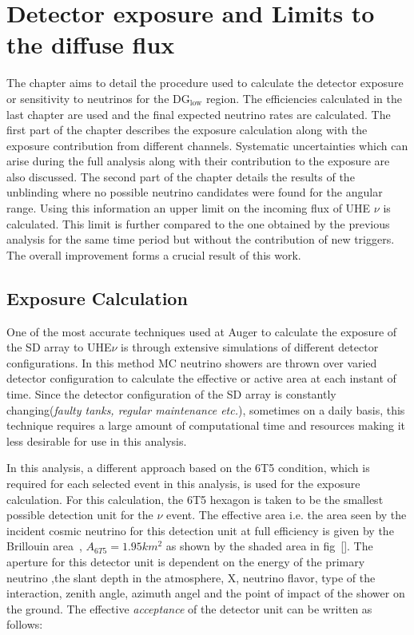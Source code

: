 
\chapter{Detector exposure and Limits to the diffuse flux}
\label{sec:align}
 
The chapter aims to detail the procedure used to calculate the detector exposure or sensitivity to neutrinos for the DG$\mathrm{_{low}}$ region. The efficiencies calculated in the last chapter are used and the final expected neutrino rates are calculated. The first part of the chapter describes the exposure calculation along with the exposure contribution from different channels. Systematic uncertainties which can arise during the full analysis along with their contribution to the exposure are also discussed. 
The second part of the chapter details the results of the unblinding where no possible neutrino candidates were found for the angular range. Using this information an upper limit on the incoming flux of UHE $\nu$ is calculated. This limit is further compared to the one obtained by the previous analysis for the same time period but without the contribution of new triggers. The overall improvement forms a crucial result of this work. 


\section{Exposure Calculation}
\label{sec:det_exposure_calc}

One of the most accurate techniques used at Auger to calculate the exposure of the SD array to UHE$\nu$ is through extensive simulations of different detector configurations. In this method MC neutrino showers are thrown over varied detector configuration to calculate the effective or active area at each instant of time. Since the detector configuration of the SD array is constantly changing(\textit{faulty tanks, regular maintenance etc.}), sometimes on a daily basis, this technique requires a large amount of computational time and resources making it less desirable for use in this analysis. 

In this analysis, a different approach based on the 6T5 condition, which is required for each selected event in this analysis, is used for the exposure calculation. For this calculation, the 6T5 hexagon is taken to be the smallest possible detection unit for the $\nu$ event. The effective area i.e. the area seen by the incident cosmic neutrino for this detection unit at full efficiency is given by the Brillouin area~\cite{PierreAuger:2010zof}, $A_{6T5} = 1.95km^2$ as shown by the shaded area in fig~\ref{}. The aperture for this detector unit is dependent on the energy of the primary neutrino ,the slant depth in the atmosphere, X, neutrino flavor, type of the interaction, zenith angle, azimuth angel and the point of impact of the shower on the ground. The effective \textit{acceptance} of the detector unit can be written as follows:

